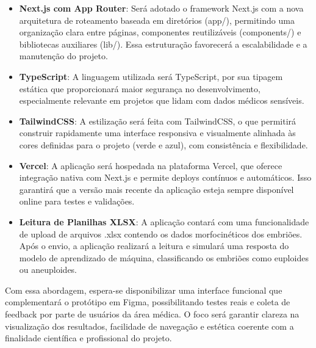 \begin{itemize}
\item \textbf{Next.js com App Router}: Será adotado o framework Next.js com a nova arquitetura de roteamento baseada em diretórios (app/), permitindo uma organização clara entre páginas, componentes reutilizáveis (components/) e bibliotecas auxiliares (lib/). Essa estruturação favorecerá a escalabilidade e a manutenção do projeto.

\item \textbf{TypeScript}: A linguagem utilizada será TypeScript, por sua tipagem estática que proporcionará maior segurança no desenvolvimento, especialmente relevante em projetos que lidam com dados médicos sensíveis.

\item \textbf{TailwindCSS}: A estilização será feita com TailwindCSS, o que permitirá construir rapidamente uma interface responsiva e visualmente alinhada às cores definidas para o projeto (verde e azul), com consistência e flexibilidade.

\item \textbf{Vercel}: A aplicação será hospedada na plataforma Vercel, que oferece integração nativa com Next.js e permite deploys contínuos e automáticos. Isso garantirá que a versão mais recente da aplicação esteja sempre disponível online para testes e validações.

\item \textbf{Leitura de Planilhas XLSX}: A aplicação contará com uma funcionalidade de upload de arquivos .xlsx contendo os dados morfocinéticos dos embriões. Após o envio, a aplicação realizará a leitura e simulará uma resposta do modelo de aprendizado de máquina, classificando os embriões como euploides ou aneuploides.
\end{itemize}

Com essa abordagem, espera-se disponibilizar uma interface funcional que complementará o protótipo em Figma, possibilitando testes reais e coleta de feedback por parte de usuários da área médica. O foco será garantir clareza na visualização dos resultados, facilidade de navegação e estética coerente com a finalidade científica e profissional do projeto.